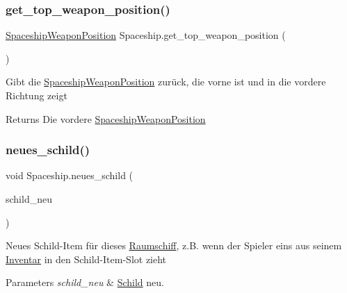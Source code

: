 \subsubsection{\texorpdfstring{get\+\_\+top\+\_\+weapon\+\_\+position()}{get\_top\_weapon\_position()}}
{\footnotesize\ttfamily \hyperlink{class_spaceship_weapon_position}{Spaceship\+Weapon\+Position} Spaceship.\+get\+\_\+top\+\_\+weapon\+\_\+position (\begin{DoxyParamCaption}{ }\end{DoxyParamCaption})}



Gibt die \hyperlink{class_spaceship_weapon_position}{Spaceship\+Weapon\+Position} zurück, die vorne ist und in die vordere Richtung zeigt 

\begin{DoxyReturn}{Returns}
Die vordere \hyperlink{class_spaceship_weapon_position}{Spaceship\+Weapon\+Position} 
\end{DoxyReturn}
\mbox{\label{class_spaceship_a51fd63c3c0bf5f1bb5d5d7e05db87056}} 
\subsubsection{\texorpdfstring{neues\+\_\+schild()}{neues\_schild()}}
{\footnotesize\ttfamily void Spaceship.\+neues\+\_\+schild (\begin{DoxyParamCaption}\item[{\hyperlink{class_schild_item}{Schild\+Item}}]{schild\+\_\+neu }\end{DoxyParamCaption})}



Neues Schild-\/\+Item für dieses \hyperlink{class_raumschiff}{Raumschiff}, z.\+B. wenn der Spieler eins aus seinem \hyperlink{class_inventar}{Inventar} in den Schild-\/\+Item-\/\+Slot zieht 


\begin{DoxyParams}{Parameters}
{\em schild\+\_\+neu} & \hyperlink{class_schild}{Schild} neu.\\
\hline
\end{DoxyParams}
\mbox{\label{class_spaceship_acc4b097a3bfdc0cbefe00246dbbcb534}} 
